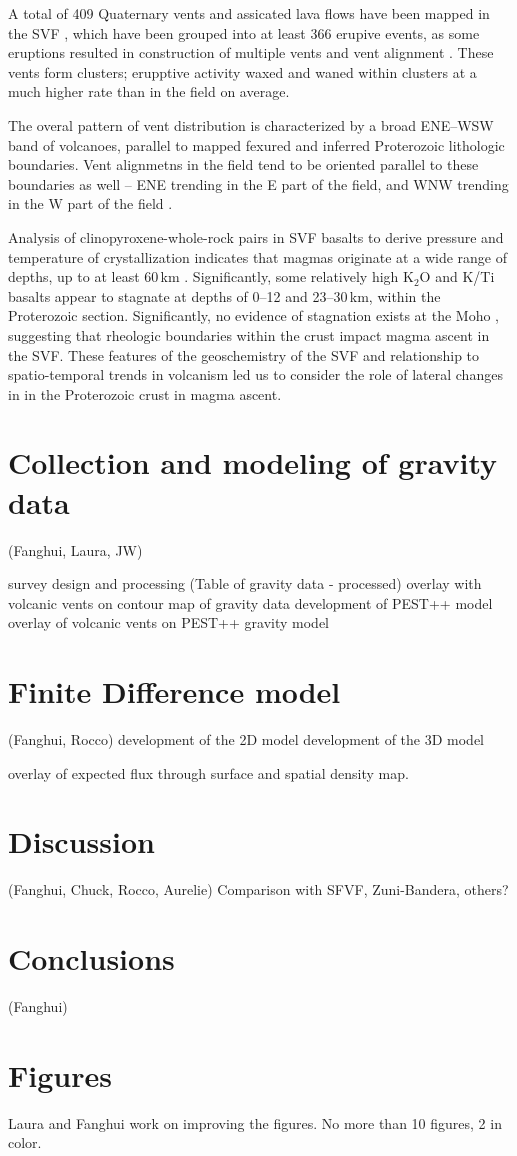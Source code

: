 \documentclass[draft,jgrga]{agutex}
\begin{document}
\begin{article}
A total of 409 Quaternary vents and assicated lava flows have been mapped in the SVF \citep{Condit1984, Condit1989}, which have been grouped into at least 366 erupive events, as some eruptions resulted in construction of multiple vents and vent alignment \citep{Condit1996}. These vents form clusters; erupptive activity waxed and waned within clusters at a much higher rate than in the field on average. 

The overal pattern of vent distribution is characterized by a broad ENE--WSW band of volcanoes, parallel to mapped fexured and inferred Proterozoic lithologic boundaries. Vent alignmetns in the field tend to be oriented parallel to these boundaries as well -- ENE trending in the E part of the field, and WNW trending in the W part of the field \citep{Connor1992}.

Analysis of clinopyroxene-whole-rock pairs in SVF basalts to derive pressure and temperature of crystallization indicates that magmas originate at a wide range of depths, up to at least 60\,km \citep{Putirka2003}. Significantly, some relatively high K$_2$O and K/Ti basalts appear to stagnate at depths of 0--12 and 23--30\,km, within the Proterozoic section. Significantly, no evidence of stagnation exists at the Moho \citep{Putirka2003}, suggesting that rheologic boundaries within the crust impact magma ascent in the SVF. These features of the geoschemistry of the SVF and relationship to spatio-temporal trends in volcanism led us to consider the role of lateral changes in in the Proterozoic crust in magma ascent.

\section{Collection and modeling of gravity data} (Fanghui, Laura, JW)

survey design and processing (Table of gravity data - processed)
overlay with volcanic vents on contour map of gravity data
development of PEST++ model
overlay of volcanic vents on PEST++ gravity model

\section{Finite Difference model} (Fanghui, Rocco)
development of the 2D model
development of the 3D model

overlay of expected flux through surface and spatial density map.

\section{Discussion} (Fanghui, Chuck, Rocco, Aurelie)
Comparison with SFVF, Zuni-Bandera, others?
\section{Conclusions} (Fanghui)




\begin{acknowledgments}

\end{acknowledgments}


\end{article}
\section{Figures}
Laura and Fanghui work on improving the figures. No more than 10 figures, 2 in color.
\end{document}
